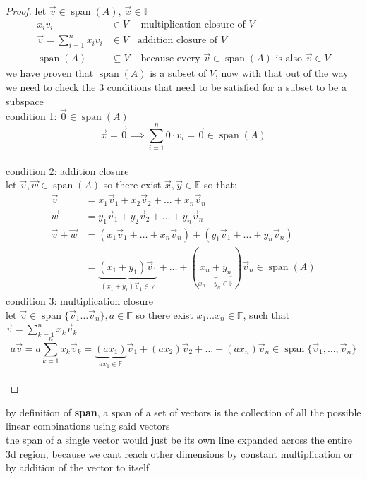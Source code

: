 \documentclass[a4paper,12pt]{article}
\DeclareMathOperator{\spn}{span}
\begin{document}
\begin{definition}
\begin{lemma}
\begin{proof}
let \(\vec{v} \in \spn(A),\ \vec{x} \in \mathbb{F}\)\\
\begin{align*}
  x_iv_i &\in V &\text{ multiplication closure of } V\\
  \vec{v} = \sum_{i=1}^{n} x_iv_i &\in V &\text{addition closure of } V\\
  \spn(A) &\subseteq V &\text{ because every } \vec{v} \in \spn(A) \text{ is also } \vec{v} \in V
\end{align*}
we have proven that \(\spn(A)\) is a subset of \(V\), now with that out of the way we need to check the 3 conditions that need to be satisfied for a subset to be a subspace\\
condition 1: \(\vec0 \in \spn(A)\)\\
\[ \vec{x} = \vec0 \implies \sum_{i=1}^{n} 0 \cdot v_i = \vec0 \in \spn(A) \]\\
condition 2: addition closure\\
let \(\vec{v}, \vec{w} \in \spn(A)\) so there exist \(\vec{x}, \vec{y} \in \mathbb{F}\) so that:\\
\begin{align*}
  \vec{v} &= x_1\vec{v}_1 + x_2\vec{v}_2 + \ldots + x_n\vec{v}_n\\
  \vec{w} &= y_1\vec{v}_1 + y_2\vec{v}_2 + \ldots + y_n\vec{v}_n\\
  \vec{v} + \vec{w} &= (x_1\vec{v}_1 + \ldots + x_n\vec{v}_n) + (y_1\vec{v}_1 + \ldots + y_n\vec{v}_n)\\
    &= \underbrace{(x_1+y_1)\vec{v}_1}_{(x_1+y_1)\vec{v}_1 \in V} + \ldots + (\underbrace{x_n+y_n}_{x_n+y_n \in \mathbb{F}})\vec{v}_n \in \spn(A)
\end{align*}
condition 3: multiplication closure\\
let \(\vec{v} \in \spn\{\vec{v}_1 \ldots \vec{v}_n\}, a \in \mathbb{F}\) so there exist \(x_1 \ldots x_n \in \mathbb{F}\), such that \(\vec{v} = \sum_{k=1}^{n} x_k\vec{v}_k\)\\
\[ a\vec{v} = a \sum_{k=1}^{n} x_k\vec{v}_k = \underbrace{(ax_1)}_{ax_1 \in \mathbb{F}}\vec{v}_1 + (ax_2)\vec{v}_2 + \ldots + (ax_n)\vec{v}_n \in \spn\{\vec{v}_1,\ldots,\vec{v}_n\} \]\\
\end{proof}
\end{lemma}

\begin{my_example}
by definition of \textbf{span}, a span of a set of vectors is the collection of all the possible linear combinations using said vectors\\
the span of a single vector would just be its own line expanded across the entire 3d region, because we cant reach other dimensions by constant multiplication or by addition of the vector to itself\\


\end{my_example}
\end{definition}
\end{document}
